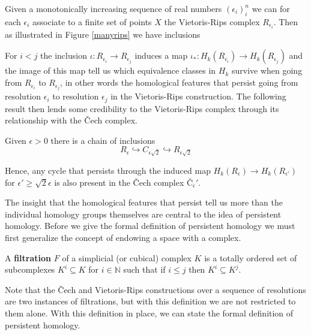 Given a monotonically increasing sequence of real numbers $(\epsilon_{i})^{n}_{i}$ we can for each $\epsilon_{i}$ associate to a finite set of points $X$ the Vietoris-Rips complex $R_{\epsilon_{i}}$. Then as illustrated in Figure \ref{manyrips} we have inclusions
\begin{center}
\end{center}
For $i<j$ the inclusion $\iota: R_{\epsilon_i} \to R_{\epsilon_{j}}$ induces a map $\iota_{*}: H_{k}(R_{\epsilon_{i}}) \to H_{k}(R_{\epsilon_j})$ and the image of this map tell us which equivalence classes in $H_{k}$ survive when going from $R_{\epsilon_{i}}$ to $R_{\epsilon_{j}}$, in other words the homological features that persist going from resolution $\epsilon_{i}$ to resolution $\epsilon_{j}$ in the Vietoris-Rips construction. The following result then lends some credibility to the Vietoris-Rips complex through its relationship with the Čech complex.
\begin{lemma}
  Given $\epsilon > 0$ there is a chain of inclusions
  \[R_{\epsilon} \hookrightarrow C_{\epsilon \sqrt{2}} \hookrightarrow R_{\epsilon \sqrt{2}}\]
\end{lemma}
Hence, any cycle that persists through the induced map $H_{k}(R_{\epsilon}) \to H_{k}(R_{\epsilon'})$ for $\epsilon'  \geq \sqrt{2} \epsilon$ is also present in the Čech complex $Č_{\epsilon}'$.

The insight that the homological features that persist tell us more than the individual homology groups themselves are central to the idea of persistent homology. Before we give the formal definition of persistent homology we must first generalize the concept of endowing a space with a complex.

\begin{definition}
A \textbf{filtration} $F$ of a simplicial (or cubical) complex $K$ is a totally ordered set of subcomplexes $K^{i}  \subseteq K$ for $i \in \mathbb{N}$ such that if $i \leq j$ then $K^{i} \subseteq K^{j}$.
\end{definition}

Note that the Čech and Vietoris-Rips constructions over a sequence of resolutions are two instances of filtrations, but with this definition we are not restricted to them alone. With this definition in place, we can state the formal definition of persistent homology.

